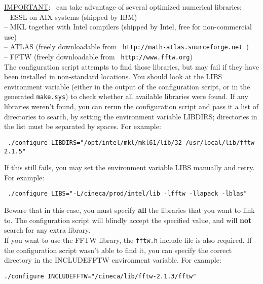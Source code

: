 \noindent \underline {IMPORTANT}: \WANT\ can take advantage of
several
optimized numerical libraries:\\
\noindent -- ESSL on AIX systems (shipped by IBM)\\
\noindent -- MKL together with Intel compilers (shipped by Intel,
free for non-commercial use)\\
\noindent -- ATLAS (freely downloadable from
   \texttt{ http://math-atlas.sourceforge.net })\\
\noindent -- FFTW (freely downloadable from
   \texttt{ http://www.fftw.org})\\

\noindent The configuration script attempts to find those
libraries, but may fail if they have been installed in
non-standard locations. You should look at the LIBS environment
variable (either in the output of the configuration script, or in
the generated {\tt make.sys}) to check whether all available
libraries were found.
If any libraries weren't found, you can rerun the
configuration script and pass it a list of directories to search,
by setting the environment variable LIBDIRS; directories in the
list must be
separated by spaces.  For example:
%
%
\begin{description}
  \item \texttt{ ./configure LIBDIRS="/opt/intel/mkl/mkl61/lib/32
  /usr/local/lib/fftw-2.1.5" }
\end{description}
%
%

\noindent If this still fails, you may set the environment
variable LIBS manually and retry.  For example:
%
%
\begin{description}
  \item \texttt{ ./configure LIBS="-L/cineca/prod/intel/lib -lfftw -llapack
  -lblas" }
\end{description}
%
%

\noindent Beware that in this case, you must specify \textbf{all} the
libraries that you want to link to.  The configuration script will
blindly accept the specified value, and will \textbf{not} search for any
extra library.\\

\noindent If you want to use the FFTW library, the \texttt{fftw.h}
include file is also required.  If the configuration script wasn't
able to find it, you can specify the correct directory in the
INCLUDEFFTW environment variable. For example:
%
%
\begin{description}
  \item {\tt ./configure INCLUDEFFTW="/cineca/lib/fftw-2.1.3/fftw" }
\end{description}
%
%

